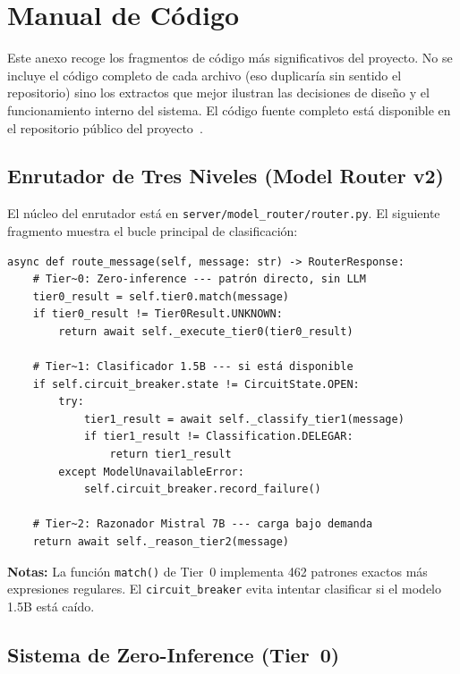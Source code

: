 \makeatletter
\renewcommand{\verbatim@font}{\scriptsize\ttfamily}
\makeatother

\chapter{Manual de Código}
\label{cap:manual_codigo}

Este anexo recoge los fragmentos de código más significativos del proyecto. No se incluye el código completo de cada archivo (eso duplicaría sin sentido el repositorio) sino los extractos que mejor ilustran las decisiones de diseño y el funcionamiento interno del sistema. El código fuente completo está disponible en el repositorio público del proyecto~\cite{repo_publico}.

\section{Enrutador de Tres Niveles (Model Router v2)}

El núcleo del enrutador está en \texttt{server/model\_router/router.py}. El siguiente fragmento muestra el bucle principal de clasificación:

\begin{verbatim}
async def route_message(self, message: str) -> RouterResponse:
    # Tier~0: Zero-inference --- patrón directo, sin LLM
    tier0_result = self.tier0.match(message)
    if tier0_result != Tier0Result.UNKNOWN:
        return await self._execute_tier0(tier0_result)
    
    # Tier~1: Clasificador 1.5B --- si está disponible
    if self.circuit_breaker.state != CircuitState.OPEN:
        try:
            tier1_result = await self._classify_tier1(message)
            if tier1_result != Classification.DELEGAR:
                return tier1_result
        except ModelUnavailableError:
            self.circuit_breaker.record_failure()
    
    # Tier~2: Razonador Mistral 7B --- carga bajo demanda
    return await self._reason_tier2(message)
\end{verbatim}

\textbf{Notas:} La función \texttt{match()} de Tier~0 implementa 462 patrones exactos más expresiones regulares. El \texttt{circuit\_breaker} evita intentar clasificar si el modelo 1.5B está caído.

\section{Sistema de Zero-Inference (Tier~0)}

